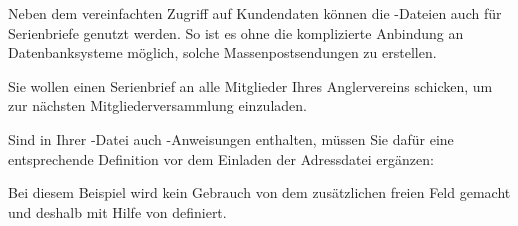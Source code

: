 Neben dem vereinfachten Zugriff auf Kundendaten können die
-Dateien auch für Serienbriefe
genutzt werden. So ist es ohne die komplizierte Anbindung an
Datenbanksysteme möglich, solche Massenpostsendungen zu erstellen.
%
\begin{Example}
  Sie wollen einen Serienbrief an alle Mitglieder Ihres
  Anglervereins schicken, um zur nächsten Mitgliederversammlung
  einzuladen.
  Sind in Ihrer -Datei auch
  -Anweisungen
  enthalten, müssen Sie dafür eine entsprechende Definition vor dem
  Einladen der Adressdatei ergänzen:
\begin{lstcode}
  \renewcommand*{\addrentry}[9]{%
    \adrentry{#1}{#2}{#3}{#4}{#5}{#6}{#7}{#9}%
  }
\end{lstcode}
  Bei diesem Beispiel wird kein Gebrauch von dem zusätzlichen freien
  Feld gemacht und deshalb  mit Hilfe von
   definiert.
\end{Example}

